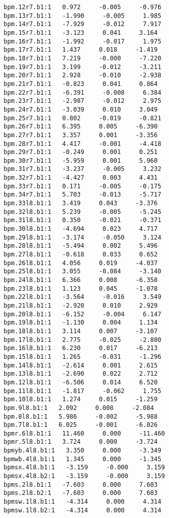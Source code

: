 \begin{verbatim}
bpm.12r7.b1:1   0.972     -0.005     -0.976
bpm.13r7.b1:1   -1.990     -0.005     1.985
bpm.14r7.b1:1   -7.929     -0.012     7.917
bpm.15r7.b1:1   -3.123     0.041     3.164
bpm.16r7.b1:1   -1.992     -0.017     1.975
bpm.17r7.b1:1   1.437     0.018     -1.419
bpm.18r7.b1:1   7.219     -0.000     -7.220
bpm.19r7.b1:1   3.199     -0.012     -3.211
bpm.20r7.b1:1   2.928     -0.010     -2.938
bpm.21r7.b1:1   -0.823     0.041     0.864
bpm.22r7.b1:1   -6.391     -0.008     6.384
bpm.23r7.b1:1   -2.987     -0.012     2.975
bpm.24r7.b1:1   -3.039     0.010     3.049
bpm.25r7.b1:1   0.802     -0.019     -0.821
bpm.26r7.b1:1   6.395     0.005     -6.390
bpm.27r7.b1:1   3.357     0.001     -3.356
bpm.28r7.b1:1   4.417     -0.001     -4.418
bpm.29r7.b1:1   -0.249     0.001     0.251
bpm.30r7.b1:1   -5.959     0.001     5.960
bpm.31r7.b1:1   -3.237     -0.005     3.232
bpm.32r7.b1:1   -4.427     0.003     4.431
bpm.33r7.b1:1   0.171     -0.005     -0.175
bpm.34r7.b1:1   5.703     -0.013     -5.717
bpm.33l8.b1:1   3.419     0.043     -3.376
bpm.32l8.b1:1   5.239     -0.005     -5.245
bpm.31l8.b1:1   0.350     -0.021     -0.371
bpm.30l8.b1:1   -4.694     0.023     4.717
bpm.29l8.b1:1   -3.174     -0.050     3.124
bpm.28l8.b1:1   -5.494     0.002     5.496
bpm.27l8.b1:1   -0.618     0.033     0.652
bpm.26l8.b1:1   4.056     0.019     -4.037
bpm.25l8.b1:1   3.055     -0.084     -3.140
bpm.24l8.b1:1   6.366     0.008     -6.358
bpm.23l8.b1:1   1.123     0.045     -1.078
bpm.22l8.b1:1   -3.564     -0.016     3.549
bpm.21l8.b1:1   -2.920     0.010     2.929
bpm.20l8.b1:1   -6.152     -0.004     6.147
bpm.19l8.b1:1   -1.130     0.004     1.134
bpm.18l8.b1:1   3.114     0.007     -3.107
bpm.17l8.b1:1   2.775     -0.025     -2.800
bpm.16l8.b1:1   6.230     0.017     -6.213
bpm.15l8.b1:1   1.265     -0.031     -1.296
bpm.14l8.b1:1   -2.614     0.001     2.615
bpm.13l8.b1:1   -2.690     0.022     2.712
bpm.12l8.b1:1   -6.506     0.014     6.520
bpm.11l8.b1:1   -1.817     -0.062     1.755
bpm.10l8.b1:1   1.274     0.015     -1.259
bpm.9l8.b1:1   2.092     0.008     -2.084
bpm.8l8.b1:1   5.986     -0.002     -5.988
bpm.7l8.b1:1   6.025     -0.001     -6.026
bpmr.6l8.b1:1   11.460     0.000     -11.460
bpmr.5l8.b1:1   3.724     0.000     -3.724
bpmyb.4l8.b1:1   3.350     0.000     -3.349
bpmwb.4l8.b1:1   1.345     0.000     -1.345
bpmsx.4l8.b1:1   -3.159     -0.000     3.159
bpmsx.4l8.b2:1   -3.159     -0.000     3.159
bpms.2l8.b1:1   -7.603     0.000     7.603
bpms.2l8.b2:1   -7.603     0.000     7.603
bpmsw.1l8.b1:1   -4.314     0.000     4.314
bpmsw.1l8.b2:1   -4.314     0.000     4.314

\end{verbatim}
